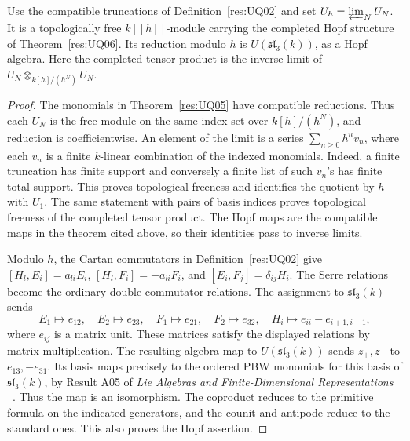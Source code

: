 \begin{theorem}
\label{res:UQ07}
Use the compatible truncations of Definition~\ref{res:UQ02}
and set \(U_h=\varprojlim_N U_N\).
It is a topologically free \(k[[h]]\)-module carrying the
completed Hopf structure of Theorem~\ref{res:UQ06}.
Its reduction modulo \(h\) is \(U(\mathfrak{sl}_3(k))\),
as a Hopf algebra. Here the completed tensor product
is the inverse limit of \(U_N\otimes_{k[h]/(h^N)} U_N\).
\end{theorem}
\begin{proof}
The monomials in Theorem~\ref{res:UQ05} have compatible
reductions. Thus each \(U_N\) is the free module on the
same index set over \(k[h]/(h^N)\), and reduction is
coefficientwise. An element of the limit is a series
\(\sum_{n\ge0}h^n v_n\), where each \(v_n\) is a finite
\(k\)-linear combination of the indexed monomials.
Indeed, a finite truncation has finite support and
conversely a finite list of such \(v_n\)'s has finite
total support. This proves topological freeness and
identifies the quotient by \(h\) with \(U_1\).
The same statement with pairs of basis indices proves
topological freeness of the completed tensor product.
The Hopf maps are the compatible maps in the theorem
cited above, so their identities pass to inverse limits.

Modulo \(h\), the Cartan commutators in Definition~\ref{res:UQ02}
give \([H_l,E_i]=a_{li}E_i\), \([H_l,F_i]=-a_{li}F_i\),
and \([E_i,F_j]=\delta_{ij}H_i\). The Serre relations
become the ordinary double commutator relations.
The assignment to \(\mathfrak{sl}_3(k)\) sends
\[
 E_1\mapsto e_{12},\quad E_2\mapsto e_{23},\quad
 F_1\mapsto e_{21},\quad F_2\mapsto e_{32},\quad
 H_i\mapsto e_{ii}-e_{i+1,i+1},
\]
where \(e_{ij}\) is a matrix unit. These matrices satisfy
the displayed relations by matrix multiplication.
The resulting algebra map to \(U(\mathfrak{sl}_3(k))\)
sends \(z_+,z_-\) to \(e_{13},-e_{31}\).
Its basis maps precisely to the ordered PBW monomials
for this basis of \(\mathfrak{sl}_3(k)\), by Result A05 of
\emph{Lie Algebras and Finite-Dimensional Representations}
~\cite[PDF pp.~8--9]{mg-lie}. Thus the map is an
isomorphism. The coproduct reduces to the primitive formula
on the indicated generators, and the counit and antipode
reduce to the standard ones. This also proves the
Hopf assertion.
\end{proof}

